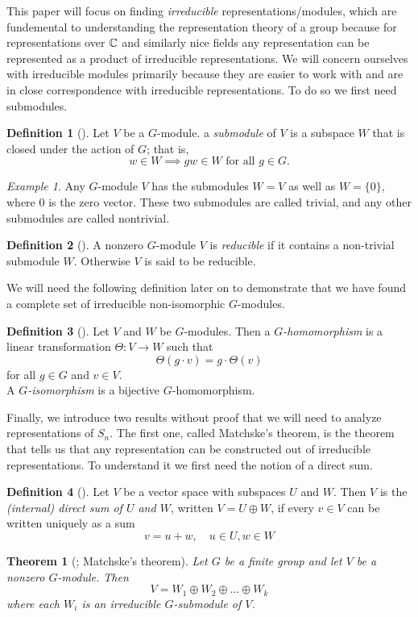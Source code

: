 \documentclass[11 pt]{amsart}
\theoremstyle{plain}   %
\newtheorem{thm}{Theorem}[section] %
\theoremstyle{definition}
\newtheorem{defn}{Definition}[section]
\theoremstyle{remark}
\newtheorem{ex}{Example}[section]
\numberwithin{equation}{section}
\begin{document}
  This paper will focus on finding \emph{irreducible} representations/modules,
  which are fundemental to understanding the representation theory of a group because
  for representations over $\mathbb{C}$ and similarly nice fields any representation can be represented as a product of irreducible representations.
  We will concern ourselves with irreducible modules primarily because they are easier to work with and are in close correspondence
  with irreducible representations. To do so we first need submodules.
  \begin{defn}[{\cite[Definition 1.4.1]{sagan}}]
    Let $V$ be a $G$-module. a \emph{submodule}
    of $V$ is a subspace $W$ that is closed under the action of $G$; that is,
    \[w \in W \implies gw \in W \text{ for all } g \in G.\]
  \end{defn}
  \begin{ex}
    Any $G$-module $V$ has the submodules $W=V$ as well as $W= \{0\}$, where $0$ is the zero vector.
    These two submodules are called trivial, and any other submodules are called nontrivial.
  \end{ex}
  \begin{defn}[{\cite[Definition 1.4.1]{sagan}}]
    A nonzero $G$-module $V$ is \emph{reducible} if it contains a non-trivial submodule $W$.
    Otherwise $V$ is said to be reducible.
  \end{defn}

  We will need the following definition later on to demonstrate that we have found a complete set of irreducible non-isomorphic $G$-modules.
  
  \begin{defn}[{\cite[Definition 1.6.1]{sagan}}]
    Let $V$ and $W$ be $G$-modules. Then a \emph{$G$-homomorphism} is a linear transformation $\Theta: V \to W$ such that
    \[\Theta(g \cdot v) = g \cdot \Theta(v)\]
    for all $g \in G$ and $v \in V$.\\
    A \emph{$G$-isomorphism} is a bijective $G$-homomorphism.
  \end{defn}
  
  Finally, we introduce two results without proof that we will need to analyze representations of $S_n$. The first one, called
  Matchske's theorem, is the theorem that tells us that any representation can be constructed out of irreducible representations.
  To understand it we first need the notion of a direct sum.
  \begin{defn}[{\cite[Definition 1.5.1]{sagan}}]
    Let $V$ be a vector space with subspaces $U$ and $W$.
    Then $V$ is the \emph{(internal) direct sum of $U$ and $W$}, written $V = U \oplus W$, if every $v \in V$ can be
    written uniquely as a sum
    \[v= u +w, \quad u \in U, w \in W\]
  \end{defn}
  \begin{thm}[{\cite[Theorem 1.5.3]{sagan}; Matchske's theorem}]
      Let $G$ be a finite group and let $V$ be a nonzero $G$-module. Then
      \[ V = W_1 \oplus W_2 \oplus \dots \oplus W_k\]
      where each $W_i$ is an irreducible $G$-submodule of $V$.
    \end{thm}
    
\end{document}
